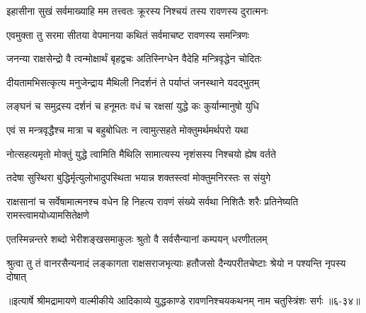 \twolineshloka
{इहासीना सुखं सर्वमाख्याहि मम तत्त्वतः}
{क्रूरस्य निश्चयं तस्य रावणस्य दुरात्मनः} %

\twolineshloka
{एवमुक्ता तु सरमा सीतया वेपमानया}
{कथितं सर्वमाचष्ट रावणस्य समन्त्रिणः} %

\twolineshloka
{जनन्या राक्षसेन्द्रो वै त्वन्मोक्षार्थं बृहद्वचः}
{अतिस्निग्धेन वैदेहि मन्त्रिवृद्धेन चोदितः} %

\twolineshloka
{दीयतामभिसत्कृत्य मनुजेन्द्राय मैथिली}
{निदर्शनं ते पर्याप्तं जनस्थाने यदद्भुतम्} %

\twolineshloka
{लङ्घनं च समुद्रस्य दर्शनं च हनूमतः}
{वधं च रक्षसां युद्धे कः कुर्यान्मानुषो युधि} %

\twolineshloka
{एवं स मन्त्रवृद्धैश्च मात्रा च बहुबोधितः}
{न त्वामुत्सहते मोक्तुमर्थमर्थपरो यथा} %

\twolineshloka
{नोत्सहत्यमृतो मोक्तुं युद्धे त्वामिति मैथिलि}
{सामात्यस्य नृशंसस्य निश्चयो ह्येष वर्तते} %

\twolineshloka
{तदेषा सुस्थिरा बुद्धिर्मृत्युलोभादुपस्थिता}
{भयान्न शक्तस्त्वां मोक्तुमनिरस्तः स संयुगे} %

\threelineshloka
{राक्षसानां च सर्वेषामात्मनश्च वधेन हि}
{निहत्य रावणं संख्ये सर्वथा निशितैः शरैः}
{प्रतिनेष्यति रामस्त्वामयोध्यामसितेक्षणे} %

\twolineshloka
{एतस्मिन्नन्तरे शब्दो भेरीशङ्खसमाकुलः}
{श्रुतो वै सर्वसैन्यानां कम्पयन् धरणीतलम्} %

\twolineshloka
{श्रुत्वा तु तं वानरसैन्यनादं लङ्कागता राक्षसराजभृत्याः}
{हतौजसो दैन्यपरीतचेष्टाः श्रेयो न पश्यन्ति नृपस्य दोषात्} %


॥इत्यार्षे श्रीमद्रामायणे वाल्मीकीये आदिकाव्ये युद्धकाण्डे रावणनिश्चयकथनम् नाम चतुस्त्रिंशः सर्गः ॥६-३४॥
